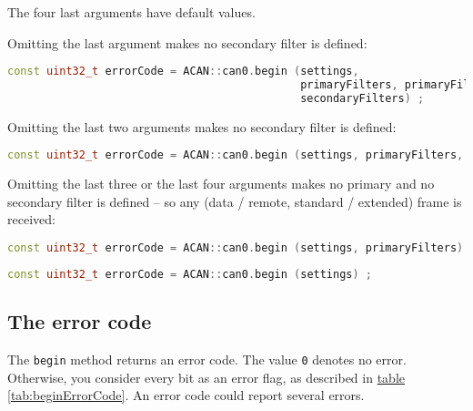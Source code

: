 \documentclass[10pt, a4paper, obeyspaces, openany]{extarticle}
\newcommand \subsectionLabel[2]{\subsection{#1}\label{subsec:#2}}
\newcommand\refTableau[1]{\hyperref[tab:#1]{table \ref*{tab:#1}}}
\begin{document}
The four last arguments have default values.

Omitting the last argument makes no secondary filter is defined:
{ \small\begin{lstlisting}[language=c++]
const uint32_t errorCode = ACAN::can0.begin (settings,
                                             primaryFilters, primaryFilterCount,
                                             secondaryFilters) ;
\end{lstlisting}}



Omitting the last two arguments makes no secondary filter is defined:
{ \small\begin{lstlisting}[language=c++]
const uint32_t errorCode = ACAN::can0.begin (settings, primaryFilters, primaryFilterCount) ;
\end{lstlisting}}

Omitting the last three or the last four arguments makes no primary and no secondary filter is defined -- so any (data / remote, standard / extended) frame is received:
{ \small\begin{lstlisting}[language=c++]
const uint32_t errorCode = ACAN::can0.begin (settings, primaryFilters) ;
\end{lstlisting}}

{ \small\begin{lstlisting}[language=c++]
const uint32_t errorCode = ACAN::can0.begin (settings) ;
\end{lstlisting}}





\subsectionLabel{The error code}{errorCodeMethodBegin}

The \texttt{begin} method returns an error code. The value \texttt{0} denotes no error. Otherwise, you consider every bit as an error flag, as described in \refTableau{beginErrorCode}. An error code could report several errors.
\end{document}

